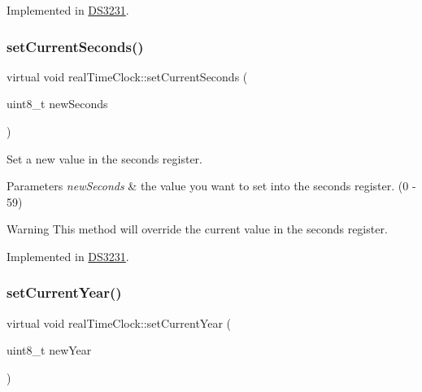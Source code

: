 Implemented in \mbox{\hyperlink{class_d_s3231_a122611bf693cdd538178b99b893a7115}{D\+S3231}}.

\mbox{\label{classreal_time_clock_a463a64d4861c75e26a80712e1dd50e6b}} 
\subsubsection{\texorpdfstring{set\+Current\+Seconds()}{setCurrentSeconds()}}
{\footnotesize\ttfamily virtual void real\+Time\+Clock\+::set\+Current\+Seconds (\begin{DoxyParamCaption}\item[{uint8\+\_\+t}]{new\+Seconds }\end{DoxyParamCaption})\hspace{0.3cm}{\ttfamily [pure virtual]}}



Set a new value in the seconds register. 


\begin{DoxyParams}{Parameters}
{\em new\+Seconds} & the value you want to set into the seconds register. (0 -\/ 59) \\
\hline
\end{DoxyParams}
\begin{DoxyWarning}{Warning}
This method will override the current value in the seconds register. 
\end{DoxyWarning}


Implemented in \mbox{\hyperlink{class_d_s3231_ac73512cc6c2a37ffb21bee74ea835a09}{D\+S3231}}.

\mbox{\label{classreal_time_clock_a4d6e8056f52cea52bab5c635c0860c12}} 
\subsubsection{\texorpdfstring{set\+Current\+Year()}{setCurrentYear()}}
{\footnotesize\ttfamily virtual void real\+Time\+Clock\+::set\+Current\+Year (\begin{DoxyParamCaption}\item[{uint8\+\_\+t}]{new\+Year }\end{DoxyParamCaption})\hspace{0.3cm}{\ttfamily [pure virtual]}}



